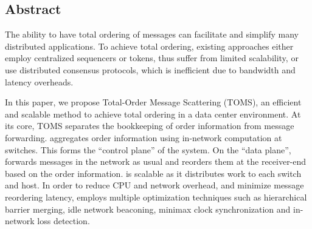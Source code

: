\subsection*{Abstract}

The ability to have total ordering of messages can facilitate and simplify many distributed applications. To achieve total ordering, existing approaches either employ centralized sequencers or tokens, thus suffer from limited scalability, or use distributed consensus protocols, which is inefficient due to  bandwidth and latency overheads.

In this paper, we propose Total-Order Message Scattering (TOMS), an efficient and scalable method to achieve total ordering in a data center environment. At its core, TOMS separates the bookkeeping of order information from message forwarding. \sys aggregates order information using in-network computation at switches. This forms the ``control plane'' of the system. On the ``data plane'', \sys forwards messages in the network as usual and reorders them at the receiver-end based on the order information. \sys is scalable as it distributes work to each switch and host. In order to reduce CPU and network overhead, and minimize message reordering latency, \sys employs multiple optimization techniques such as hierarchical barrier merging, idle network beaconing, minimax clock synchronization and in-network loss detection.





